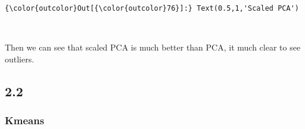 \documentclass[11pt]{article}
\begin{document}
\begin{Verbatim}[commandchars=\\\{\}]
{\color{outcolor}Out[{\color{outcolor}76}]:} Text(0.5,1,'Scaled PCA')
\end{Verbatim}
            
    \begin{center}
    \end{center}
    { \hspace*{\fill} \\}
    
    Then we can see that scaled PCA is much better than PCA, it much clear
to see outliers.

    \subsection{2.2}\label{section}

    \subsubsection{Kmeans}\label{kmeans}
\end{document}
